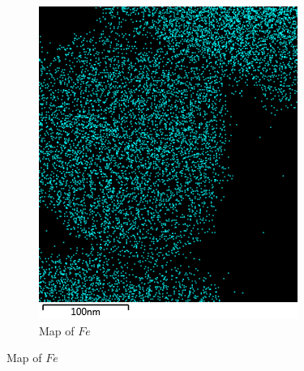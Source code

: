 \documentclass[12pt,a4paper]{article}
\begin{document}
\begin{figure}[htbp]
\begin{subfigure}[b]{0.35\textwidth}
    \includegraphics[width=\textwidth]{Data/Fe Map.png}
    \caption{Map of $Fe$}
    \label{fig:fe_map}
  \end{subfigure}
  

\end{figure}
\end{document}

